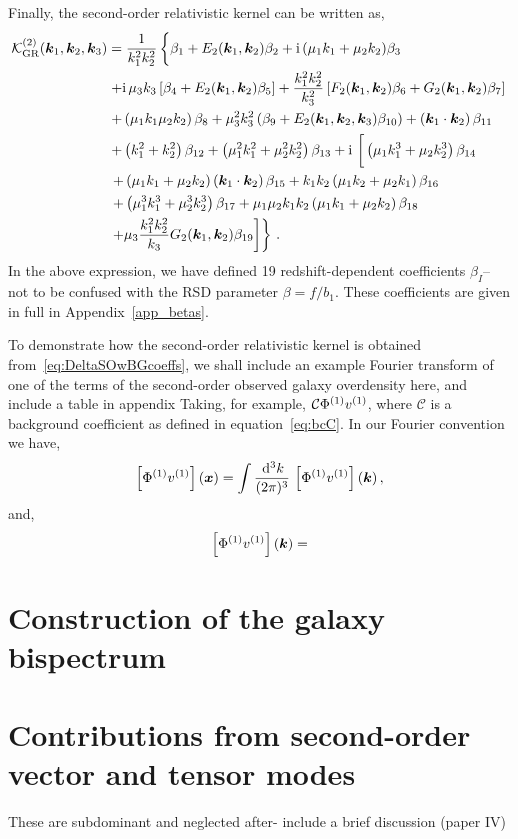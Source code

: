 Finally, the second-order relativistic kernel can be written as, 
\begin{align}
	\ko_\mathrm{GR}^{(2)}(\ka,\kb,\kc) &= \frac{1}{k_1^2 k_2^2} \left\{ \vphantom{\frac{k_1^2 k_2^2}{k_3}} \beta_1 + E_2(\ka,\kb) \beta_2 +\i (\mu_1k_1+\mu_2k_2)\beta_3 \right. \nonumber \\
&\left. + \i \mu_3 k_3\left[ \beta_{4} + E_2(\ka, \kb)\beta_{5}\right] +\frac{k_1^2 k_2^2}{k_3^2} \left[ F_2(\ka,\kb) \beta_{6} + G_2(\ka,\kb) \beta_{7} \right]\right. \nonumber \\
&\left.  + \left( \mu_1 k_1 \mu_2 k_2 \right)\beta_{8} + \mu_3^2 k_3^2 \left(\beta_{9} + E_2(\ka,\kb,\kc) \beta_{10} \right)  + \left(\ka \cdot \kb \right)\beta_{11} \right. \nonumber \\
&\left. + \left( k_1^2 + k_2^2 \right) \beta_{12} + \left( \mu_1^2 k_1^2 + \mu_2^2 k_2^2 \right) \beta_{13} + \i \left[\vphantom{\frac{k_1^2 k_2^2}{k_3}} \left( \mu_1 k_1^3 + \mu_2 k_2^3 \right)\beta_{14} \right. \right. \nonumber \\
&\left. \left. + \left( \mu_1 k_1 + \mu_2 k_2 \right) \left(\ka\cdot\kb \right) \beta_{15} + k_1 k_2 \left(\mu_1 k_2 + \mu_2 k_1 \right) \beta_{16} \right. \right. \nonumber \\
& \left. \left. + \left( \mu_1^3 k_1^3 + \mu_2^3 k_2^3 \right)\beta_{17} + \mu_1 \mu_2 k_1 k_2 \left( \mu_1 k_1 + \mu_2 k_2 \right) \beta_{18} \right. \right. \nonumber \\
& \left. \left. + \mu_3 \frac{k_1^2 k_2^2}{k_3} G_2(\ka,\kb) \beta_{19} \right] \right\}\,.
\end{align}
In the above expression, we have defined 19 redshift-dependent coefficients $\beta_I$-- not to be confused with the RSD parameter $\beta = f / b_1$. These coefficients are given in full in Appendix~\ref{app_betas}. 

To demonstrate how the second-order relativistic kernel is obtained from~\eqref{eq:DeltaSOwBGcoeffs}, we shall include an example Fourier transform of one of the terms of the second-order observed galaxy overdensity here, and include a table in appendix 
Taking, for example, $\mathcal{C} \Phi^{(1)} v^{(1)}$, where $\mathcal{C}$ is a background coefficient as defined in equation~\eqref{eq:bcC}. In our Fourier convention we have, 
\begin{equation}
	\left[ \Phi^{(1)} v^{(1)} \right](\bm {x}) = \int \frac{\,\mathrm{d}^3 k}{(2\pi)^3}\, \left[ \Phi^{(1)} v^{(1)} \right] (\bm {k})\,,
\end{equation}
and, 
\begin{equation}
	\left[ \Phi^{(1)} v^{(1)} \right](\bm {k}) = 
\end{equation}

\section{Construction of the galaxy bispectrum}


\section{Contributions from second-order vector and tensor modes}\label{sec:tensorvector}

These are subdominant and neglected after- include a brief discussion (paper IV\cite{Jolicoeur:2018blf})



